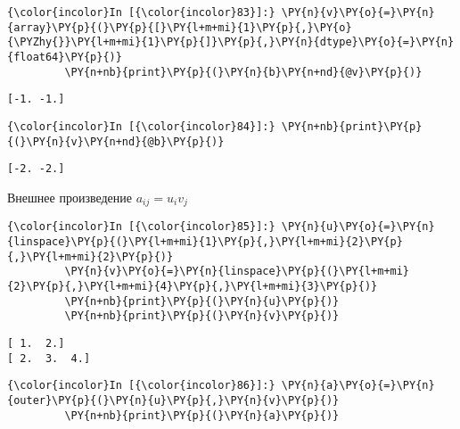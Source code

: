     \begin{Verbatim}[commandchars=\\\{\}]
{\color{incolor}In [{\color{incolor}83}]:} \PY{n}{v}\PY{o}{=}\PY{n}{array}\PY{p}{(}\PY{p}{[}\PY{l+m+mi}{1}\PY{p}{,}\PY{o}{\PYZhy{}}\PY{l+m+mi}{1}\PY{p}{]}\PY{p}{,}\PY{n}{dtype}\PY{o}{=}\PY{n}{float64}\PY{p}{)}
         \PY{n+nb}{print}\PY{p}{(}\PY{n}{b}\PY{n+nd}{@v}\PY{p}{)}
\end{Verbatim}

    \begin{Verbatim}[commandchars=\\\{\}]
[-1. -1.]

    \end{Verbatim}

    \begin{Verbatim}[commandchars=\\\{\}]
{\color{incolor}In [{\color{incolor}84}]:} \PY{n+nb}{print}\PY{p}{(}\PY{n}{v}\PY{n+nd}{@b}\PY{p}{)}
\end{Verbatim}

    \begin{Verbatim}[commandchars=\\\{\}]
[-2. -2.]

    \end{Verbatim}

    Внешнее произведение \(a_{ij}=u_i v_j\)

    \begin{Verbatim}[commandchars=\\\{\}]
{\color{incolor}In [{\color{incolor}85}]:} \PY{n}{u}\PY{o}{=}\PY{n}{linspace}\PY{p}{(}\PY{l+m+mi}{1}\PY{p}{,}\PY{l+m+mi}{2}\PY{p}{,}\PY{l+m+mi}{2}\PY{p}{)}
         \PY{n}{v}\PY{o}{=}\PY{n}{linspace}\PY{p}{(}\PY{l+m+mi}{2}\PY{p}{,}\PY{l+m+mi}{4}\PY{p}{,}\PY{l+m+mi}{3}\PY{p}{)}
         \PY{n+nb}{print}\PY{p}{(}\PY{n}{u}\PY{p}{)}
         \PY{n+nb}{print}\PY{p}{(}\PY{n}{v}\PY{p}{)}
\end{Verbatim}

    \begin{Verbatim}[commandchars=\\\{\}]
[ 1.  2.]
[ 2.  3.  4.]

    \end{Verbatim}

    \begin{Verbatim}[commandchars=\\\{\}]
{\color{incolor}In [{\color{incolor}86}]:} \PY{n}{a}\PY{o}{=}\PY{n}{outer}\PY{p}{(}\PY{n}{u}\PY{p}{,}\PY{n}{v}\PY{p}{)}
         \PY{n+nb}{print}\PY{p}{(}\PY{n}{a}\PY{p}{)}
\end{Verbatim}

